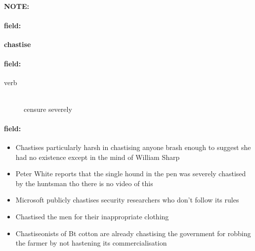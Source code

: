 \documentclass[12pt]{article}
\newenvironment{note}{\paragraph{NOTE:}}{}
\newenvironment{field}{\paragraph{field:}}{}
\begin{document}
\begin{note}
\begin{field}
\textbf{\large chastise}
\end{field}


\begin{field}
\begin{description}
\item[verb] \hfill \\ 
censure severely

\end{description}
\end{field}

\begin{field}
\begin{itemize}
\item Chastises particularly harsh in chastising anyone brash enough to suggest she had no existence except in the mind of William Sharp
\item Peter White reports that the single hound in the pen was severely chastised by the huntsman tho there is no video of this
\item Microsoft publicly chastises security researchers who don't follow its rules
\item Chastised the men for their inappropriate clothing
\item Chastiseonists of Bt cotton are already chastising the government for robbing the farmer by not hastening its commercialisation
\end{itemize}
\end{field}
\end{note}
\end{document}
